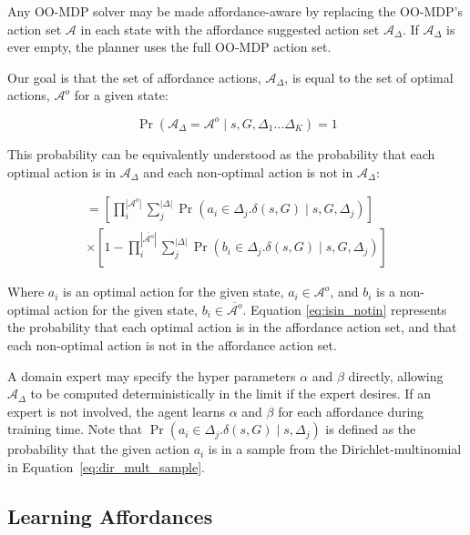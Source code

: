 \documentclass[conference]{IEEEtran}
\begin{document}
Any OO-MDP solver may be made affordance-aware by replacing the 
OO-MDP's action set $\mathcal{A}$ in each state with the affordance 
suggested action set $\mathcal{A}_\Delta$. If $\mathcal{A}_\Delta$ is 
ever empty, the planner uses the full OO-MDP action set.

Our goal is that the set of affordance actions, $\mathcal{A}_{\Delta}$, 
is equal to the set of optimal actions, $\mathcal{A}^o$ for a given state:

\begin{equation} 
\Pr( \mathcal{A}_{\Delta} = \mathcal{A}^o \mid s, G, \Delta_1 \dots \Delta_K) = 1
\label{eq:opt}
\end{equation}

This probability can be equivalently understood as the probability that each
optimal action is in $\mathcal{A}_{\Delta}$ and each non-optimal action is 
not in $\mathcal{A}_{\Delta}$:

\begin{multline}
= \left[\prod_i^{|\mathcal{A}^o|} \sum_j^{|\Delta|} \Pr(a_i \in \Delta_j.\delta(s,G) \mid s, G, \Delta_j)\right] \\
\times \left[1 - \prod_i^{|\overline{\mathcal{A}^o}|} \sum_j^{|\Delta|} \Pr(b_i \in \Delta_j.\delta(s,G) \mid s, G, \Delta_j)\right]
\label{eq:isin_notin}
\end{multline}

Where $a_i$ is an optimal action for the given state, $a_i \in \mathcal{A}^o$,
and $b_i$ is a non-optimal action for the given state, $b_i \in \overline{\mathcal{A}^o}$.
Equation \ref{eq:isin_notin} represents the probability that each optimal action is in the
affordance action set, and that each non-optimal action is not in the affordance action set.

A domain expert may specify the hyper parameters $\alpha$ and $\beta$ directly,
allowing $\mathcal{A_\Delta}$ to be computed deterministically in the limit if 
the expert desires. If an expert is not involved, the agent learns $\alpha$ and
$\beta$ for each affordance during training time. Note that $\Pr(a_i \in \Delta_j.\delta(s,G) \mid s, \Delta_j)$ is
defined as the probability that the given action $a_i$ is in a sample from the Dirichlet-multinomial
in Equation~\ref{eq:dir_mult_sample}.

\subsection{Learning Affordances}
\end{document}
